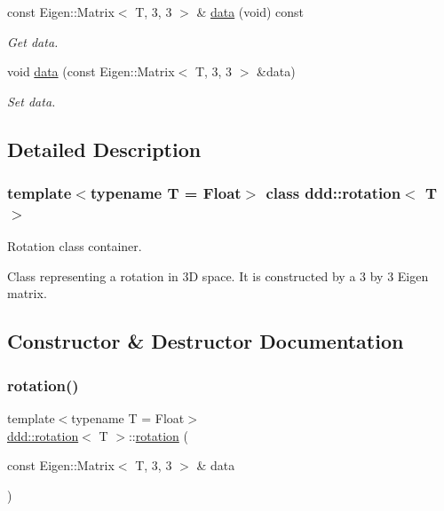\begin{DoxyCompactItemize}
\mbox{\label{classddd_1_1mat_object_a4e06f4a888443bc139c8081d664b4449}} 
const Eigen\+::\+Matrix$<$ T, 3, 3 $>$ \& \hyperlink{classddd_1_1mat_object_a4e06f4a888443bc139c8081d664b4449}{data} (void) const
\begin{DoxyCompactList}\small\item\em Get data. \end{DoxyCompactList}\item 
void \hyperlink{classddd_1_1mat_object_a5bff8ef1182818135f4b82e978ff3bbf}{data} (const Eigen\+::\+Matrix$<$ T, 3, 3 $>$ \&data)
\begin{DoxyCompactList}\small\item\em Set data. \end{DoxyCompactList}\end{DoxyCompactItemize}


\subsection{Detailed Description}
\subsubsection*{template$<$typename T = Float$>$\newline
class ddd\+::rotation$<$ T $>$}

Rotation class container. 

Class representing a rotation in 3D space. It is constructed by a 3 by 3 Eigen matrix. 

\subsection{Constructor \& Destructor Documentation}
\mbox{\label{classddd_1_1rotation_a10b7bcc20f352a49767460ebde9a1fcf}} 
\subsubsection{\texorpdfstring{rotation()}{rotation()}\hspace{0.1cm}{\footnotesize\ttfamily [1/2]}}
{\footnotesize\ttfamily template$<$typename T  = Float$>$ \\
\hyperlink{classddd_1_1rotation}{ddd\+::rotation}$<$ T $>$\+::\hyperlink{classddd_1_1rotation}{rotation} (\begin{DoxyParamCaption}\item[{const Eigen\+::\+Matrix$<$ T, 3, 3 $>$ \&}]{data }\end{DoxyParamCaption})\hspace{0.3cm}{\ttfamily [inline]}}




